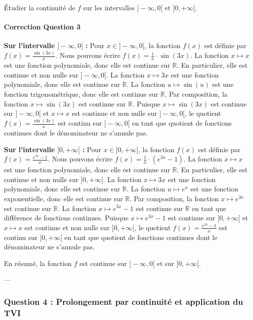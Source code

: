 \documentclass[12pt,a4paper]{report}
\begin{document}
Étudier la continuité de $f$ sur les intervalles $]-\infty, 0[$ et $]0, +\infty[$.

\paragraph{Correction Question 3}

\textbf{Sur l'intervalle $]-\infty, 0[$ :}
Pour $x \in ]-\infty, 0[$, la fonction $f(x)$ est définie par $f(x) = \frac{\sin(3x)}{x}$.
Nous pouvons écrire $f(x) = \frac{1}{x} \cdot \sin(3x)$.
La fonction $x \mapsto x$ est une fonction polynomiale, donc elle est continue sur $\mathbb{R}$. En particulier, elle est continue et non nulle sur $]-\infty, 0[$.
La fonction $x \mapsto 3x$ est une fonction polynomiale, donc elle est continue sur $\mathbb{R}$.
La fonction $u \mapsto \sin(u)$ est une fonction trigonométrique, donc elle est continue sur $\mathbb{R}$.
Par composition, la fonction $x \mapsto \sin(3x)$ est continue sur $\mathbb{R}$.
Puisque $x \mapsto \sin(3x)$ est continue sur $]-\infty, 0[$ et $x \mapsto x$ est continue et non nulle sur $]-\infty, 0[$, le quotient $f(x) = \frac{\sin(3x)}{x}$ est continu sur $]-\infty, 0[$ en tant que quotient de fonctions continues dont le dénominateur ne s'annule pas.

\textbf{Sur l'intervalle $]0, +\infty[$ :}
Pour $x \in ]0, +\infty[$, la fonction $f(x)$ est définie par $f(x) = \frac{e^{3x} - 1}{x}$.
Nous pouvons écrire $f(x) = \frac{1}{x} \cdot (e^{3x} - 1)$.
La fonction $x \mapsto x$ est une fonction polynomiale, donc elle est continue sur $\mathbb{R}$. En particulier, elle est continue et non nulle sur $]0, +\infty[$.
La fonction $x \mapsto 3x$ est une fonction polynomiale, donc elle est continue sur $\mathbb{R}$.
La fonction $u \mapsto e^u$ est une fonction exponentielle, donc elle est continue sur $\mathbb{R}$.
Par composition, la fonction $x \mapsto e^{3x}$ est continue sur $\mathbb{R}$.
La fonction $x \mapsto e^{3x} - 1$ est continue sur $\mathbb{R}$ en tant que différence de fonctions continues.
Puisque $x \mapsto e^{3x} - 1$ est continue sur $]0, +\infty[$ et $x \mapsto x$ est continue et non nulle sur $]0, +\infty[$, le quotient $f(x) = \frac{e^{3x} - 1}{x}$ est continu sur $]0, +\infty[$ en tant que quotient de fonctions continues dont le dénominateur ne s'annule pas.

En résumé, la fonction $f$ est continue sur $]-\infty, 0[$ et sur $]0, +\infty[$.

---

\subsubsection{Question 4 : Prolongement par continuité et application du TVI}
\end{document}
